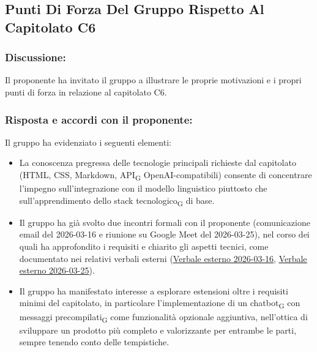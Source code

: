 \subsection{Punti Di Forza Del Gruppo Rispetto Al Capitolato C6}
 
\subsubsection*{Discussione:}
Il proponente ha invitato il gruppo a illustrare le proprie motivazioni e
i propri punti di forza in relazione al capitolato C6.
 
\subsubsection*{Risposta e accordi con il proponente:}
 
Il gruppo ha evidenziato i seguenti elementi:
 
\begin{itemize}
    \item La conoscenza pregressa delle tecnologie principali richieste
          dal capitolato (HTML, CSS, Markdown, API\textsubscript{G} OpenAI-compatibili) consente
          di concentrare l'impegno sull'integrazione con il modello linguistico
          piuttosto che sull'apprendimento dello stack tecnologico\textsubscript{G} di base.
    \item Il gruppo ha già svolto due incontri formali con il proponente
          (comunicazione email del 2026-03-16 e riunione su Google Meet del
          2026-03-25), nel corso dei quali ha approfondito i requisiti e chiarito
          gli aspetti tecnici, come documentato nei relativi verbali esterni (\href{https://synergo-unit-unipd.github.io/Documentary-Repo/docs/CC/doc_gestionali/verb_esterni/verb_est_2026_03_16_zucchetti/verb_est_2026_03_16_zucchetti.pdf}{\underline{Verbale esterno 2026-03-16}}, \href{https://synergo-unit-unipd.github.io/Documentary-Repo/docs/CC/doc_gestionali/verb_esterni/verb_est_2026_03_25_zucchetti/verb_est_2026_03_25_zucchetti.pdf}{\underline{Verbale esterno 2026-03-25}}).
    \item Il gruppo ha manifestato interesse a esplorare estensioni oltre i
          requisiti minimi del capitolato, in particolare l'implementazione di
          un chatbot\textsubscript{G} con messaggi precompilati\textsubscript{G} come funzionalità opzionale
          aggiuntiva, nell'ottica di sviluppare un prodotto più completo e
          valorizzante per entrambe le parti, sempre tenendo conto delle tempistiche.
\end{itemize}
 
